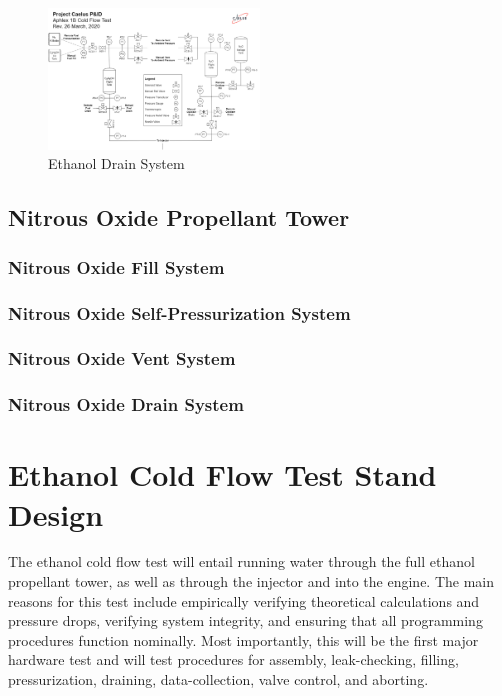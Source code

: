 \documentclass[9pt]{article} %
\numberwithin{equation}{section} %
\begin{document}
\begin{figure}[!htb] 
    \centering
    \includegraphics[scale=0.5, width=0.5\textwidth, trim={7cm 7cm 28cm 19.2cm}, clip]{pid} %
    \caption{Ethanol Drain System}
    \label{fig:ethanol_drain_system}
\end{figure}

\subsection{Nitrous Oxide Propellant Tower}
\subsubsection{Nitrous Oxide Fill System}
\subsubsection{Nitrous Oxide Self-Pressurization System}
\subsubsection{Nitrous Oxide Vent System}
\subsubsection{Nitrous Oxide Drain System}

\section{Ethanol Cold Flow Test Stand Design}
\hspace{\parindent} The ethanol cold flow test will entail running water through the full ethanol propellant tower, as well as through the injector and into the engine. The main reasons for this test include empirically verifying theoretical calculations and pressure drops, verifying system integrity, and ensuring that all programming procedures function nominally. Most importantly, this will be the first major hardware test and will test procedures for assembly, leak-checking, filling, pressurization, draining, data-collection, valve control, and aborting.
\end{document}

